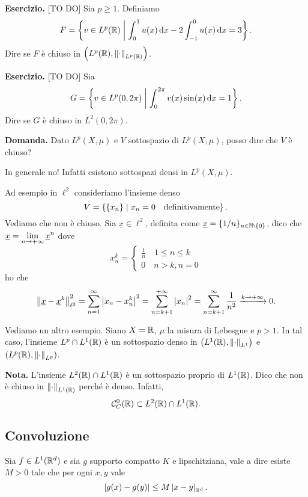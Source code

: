 \documentclass[a4paper, 12pt]{report}
\begin{document}
\textbf{Esercizio.} [TO DO] Sia $p \geq 1$. Definiamo 
%
$$
F = \left\{ v \in L^p(\mathbb R) \;\middle|\; \int_{0}^{1} u(x) \,\mathrm{d} x - 2 \int_{-1}^{0} u(x) \,\mathrm{d} x = 3 \right\}.
$$
%
Dire se $F$ è chiuso in $\left( L^p(\mathbb R), \left\lVert \cdot  \right\rVert_{L^p(\mathbb R)} \right)$.


\textbf{Esercizio.} [TO DO] Sia 
%
$$
G = \left\{ v \in L^p(0,2\pi) \;\middle|\; \int_{0}^{2\pi} v(x) \sin(x) \,\mathrm{d} x = 1  \right\}.
$$
%
Dire se $G$ è chiuso in $L^2(0,2\pi)$.

\textbf{Domanda.} Dato $L^p (X,\mu)$ e $V$ sottospazio di $L^p(X,\mu)$, posso dire che $V$ è chiuso?

In generale no! Infatti esistono sottospazi densi in $L^p(X,\mu)$.

Ad esempio in $\ell^2$ consideriamo l'insieme denso
%
$$
V = \left\{ \left\{ x_n \right\} \;\middle|\; x_n = 0 \quad \text{definitivamente}  \right\}.
$$
%
Vediamo che non è chiuso. Sia $\underline{x} \in \ell^2$, definita come $\underline{x} = \{ 1 / n \}_{n \in \N \setminus \{0 \}}$, dico che $\displaystyle \underline{x} = \lim_{n \to +\infty} \underline{x}^n$ dove
%
$$
x_n^k = 
\begin{cases}
\frac{1}{n} \quad 1 \leq n \leq k \\
0 \quad n > k, n = 0
\end{cases} 
$$
%
ho che
%
$$
\left\lVert \underline{x} - \underline{x}^k \right\rVert_{\ell^2}^2 = \sum_{n=1}^{\infty} \left| x_n -x_n^k \right|^2 = \sum_{n = k+1}^{+\infty} \left| x_n \right|^2 = \sum_{n = k+1}^{\infty} \frac{1}{n^2} \xrightarrow{k \to +\infty} 0.   
$$
%

Vediamo un altro esempio. Siano $X = \mathbb R$, $\mu$ la misura di Lebesgue e $p > 1$.
In tal caso, l'insieme $L^p \cap L^1 (\mathbb R)$ è un sottospazio denso in $\left( L^1(\mathbb R), \left\lVert \cdot  \right\rVert_{L^1} \right)$ e $\left( L^p(\mathbb R), \left\lVert \cdot  \right\rVert_{L^p} \right)$.

\textbf{Nota.} L'insieme $L^2(\mathbb R) \cap L^1(\mathbb R)$ è un sottospazio proprio di $L^1(\mathbb R)$. Dico che non è chiuso in $\left\lVert \cdot  \right\rVert_{L^1(\mathbb R)}$ perché è denso.
Infatti, 
%
$$
\mathcal{C}_C^0(\mathbb R) \subset L^2(\mathbb R) \cap L^1(\mathbb R).
$$
%

\subsection{Convoluzione}

Sia $f \in L^1(\mathbb R^d)$ e sia $g$ supporto compatto $K$ e lipschitziana, vale a dire esiste $M > 0$ tale che per ogni $x,y $ vale
%
$$
\left| g(x) - g(y) \right| \leq M \left| x - y \right|_{\mathbb R^d}.
$$
%
\end{document}
